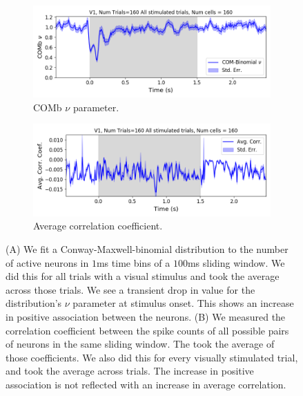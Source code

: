   \begin{figure}[h]
    \begin{subfigure}[h]{\linewidth}
      \includegraphics[width=\linewidth]{figures/conway_maxwell/v1_1ms_comb_nu_all_stimulated_trials.png}
      \caption{COMb $\nu$ parameter.}
      \label{fig:comb_nu_parameter}
    \end{subfigure}
    \begin{subfigure}[h]{\linewidth}
      \includegraphics[width=\linewidth]{figures/conway_maxwell/v1_1ms_corr_avg_all_stimulated_trials.png}
      \caption{Average correlation coefficient.}
      \label{fig:avg_corr_coef}
    \end{subfigure}
    \caption{(A) We fit a Conway-Maxwell-binomial distribution to the number of active neurons in $1$ms time bins of a $100$ms sliding window. We did this for all trials with a visual stimulus and took the average across those trials. We see a transient drop in value for the distribution's $\nu$ parameter at stimulus onset. This shows an increase in positive association between the neurons. (B) We measured the correlation coefficient between the spike counts of all possible pairs of neurons in the same sliding window. The took the average of those coefficients. We also did this for every visually stimulated trial, and took the average across trials. The increase in positive association is not reflected with an increase in average correlation.}
    \label{fig:comb_nu_and_corr}
  \end{figure}

